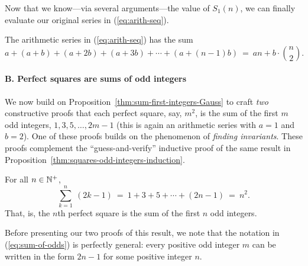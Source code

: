 \medskip

Now that we know---via several arguments---the value of $S_1(n)$, we
can finally evaluate our original series in (\ref{eq:arith-seq}).

\begin{prop}
\label{thm:sum-of-arithmetic-series}
The arithmetic series in (\ref{eq:arith-seq}) has the sum
\[
a + (a+b) + (a+2b) + (a+3b) + \cdots + (a+(n-1)b) \ = \
an + b \cdot {n \choose 2}. 
\]
\end{prop}


\paragraph{B. Perfect squares are sums of odd integers}

We now build on Proposition~\ref{thm:sum-first-integers-Gauss} to
craft {\em two} constructive proofs that each perfect square, say,
$m^2$, is the sum of the first $m$ odd integers, $1, 3, 5, \ldots,
2m-1$ (this is again an arithmetic series with $a=1$ and $b=2$).  One of these proofs builds on the phenomenon of {\em finding
  invariants}.  These proofs complement the ``guess-and-verify''
inductive proof of the same result in
Proposition~\ref{thm:squares-odd-integers-induction}.

\begin{prop}
\label{thm:squares-odd-integers-Gauss}
For all $n \in \mathbb{N}^+$,
\begin{equation}
\label{eq:sum-of-odds}
\sum_{k=1}^n \ (2k-1)
 \ = \ 1 + 3 + 5 + \cdots + (2n-1) \ = \ n^2.
\end{equation}
That, is, the $n$th perfect square is the sum of the first $n$ odd
integers.
\end{prop}

Before presenting our two proofs of this result, we note that the
notation in (\ref{eq:sum-of-odds}) is perfectly general: every positive
odd integer $m$ can be written in the form $2n-1$ for some positive
integer $n$.

\smallskip

